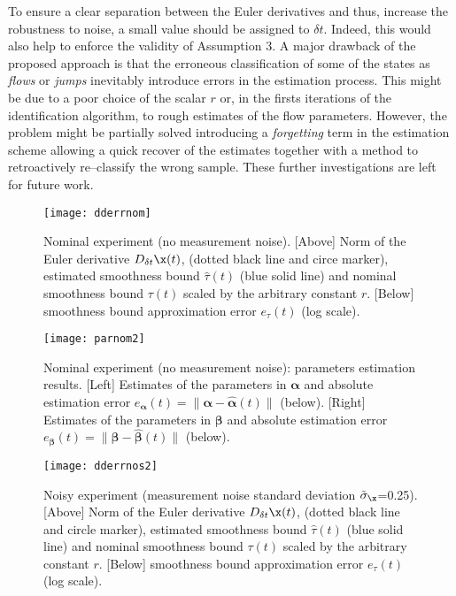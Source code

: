 To ensure a clear separation between the Euler derivatives and thus, increase the robustness to noise, a small value should be assigned to $\delta t$. {%
 Indeed, this would also help to enforce the validity of Assumption 3.
 }
 {%
 A major drawback of the proposed approach is that the erroneous classification of some of the states as \textit{flows} or \textit{jumps} inevitably introduce errors in the estimation process. This might be due to a poor choice of the scalar $r$ or, in the firsts iterations of the identification algorithm, to rough estimates of the flow parameters. 
However, the problem might be partially solved introducing a \textit{forgetting} term in the estimation scheme \cite{soderstrom2018errors} allowing a quick recover of the estimates together with a method to retroactively re--classify the wrong sample. These further investigations are left for future work.
 }
\begin{figure}[t!]
	\centering
	\texttt{[image: dderrnom]}
	\caption{Nominal experiment (no measurement noise). [Above] Norm of the Euler derivative $D_{\delta t}\x(t)$, (dotted black line and circe marker), estimated smoothness bound $\hat{\tau}(t)$ (blue solid line) and nominal smoothness bound $\tau(t)$ scaled by the arbitrary constant $r$. [Below] smoothness bound approximation error $e_{\tau}(t)$ (log scale).}
	\label{fig:dderrnom}
\end{figure}
%
%
\begin{figure}[t!]
	\centering
	\texttt{[image: parnom2]}
	\caption{Nominal experiment (no measurement noise): parameters estimation results. [Left] Estimates of the parameters in $\bm{\alpha}$ and absolute estimation error $e_{\bm{\alpha}}(t)=\|\bm{\alpha}-\hat{\bm{\alpha}}(t)\|$ (below). [Right] Estimates of the parameters in $\bm{\beta}$ and absolute estimation error $e_{\bm{\beta}}(t)=\|\bm{\beta}-\hat{\bm{\beta}}(t)\|$ (below).}
	\label{fig:parnom}
\end{figure}
%
\begin{figure}[t!]
	\centering
	\texttt{[image: dderrnos2]}
	\caption{Noisy experiment (measurement noise standard deviation $\tilde{\sigma}_{\x}$=0.25). [Above] Norm of the Euler derivative $D_{\delta t}\x(t)$, (dotted black line and circle marker), estimated smoothness bound $\hat{\tau}(t)$ (blue solid line) and nominal smoothness bound $\tau(t)$ scaled by the arbitrary constant $r$. [Below] smoothness bound approximation error $e_{\tau}(t)$ (log scale).}
	\label{fig:dderrnos}
\end{figure}
